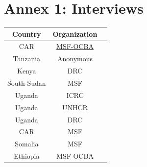 \documentclass[a4paper,12pt,twoside]{article}
\begin{document}
\section{Annex 1: Interviews}

\begin{center}
\begin{tabular}{|c|c|c|}  
 \hline
Country & Organization \\
\hline
CAR & \href{https://drive.google.com/open?id=1hKWbOf09AfBav2jGUfdhXv7ZLtpaG9QQRA_ePARLTn0}{MSF-OCBA} \\
\hline
Tanzania & Anonymous \\ 
\hline
Kenya & DRC \\
\hline
South Sudan	& MSF \\
\hline
Uganda & ICRC \\
\hline 
Uganda & UNHCR \\
\hline
Uganda & DRC \\
\hline
CAR & MSF \\
\hline
Somalia & MSF \\
\hline
Ethiopia & MSF OCBA \\
\hline
\end{tabular}
\end{center}
\end{document}
